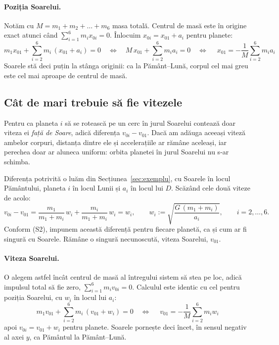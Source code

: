 \documentclass[11pt,a4paper]{article}
\begin{document}
\paragraph{Poziția Soarelui.} Notăm cu $M = m_1 + m_2 + \dots + m_6$ masa totală. Centrul de masă este în origine exact atunci când $\sum_{i=1}^{6} m_i x_{0i} = 0$. Înlocuim $x_{0i} = x_{01} + a_i$ pentru planete:
\[
  m_1 x_{01} + \sum_{i=2}^{6} m_i\,(x_{01} + a_i) = 0
  \quad\Longleftrightarrow\quad
  M\,x_{01} + \sum_{i=2}^{6} m_i a_i = 0
  \quad\Longleftrightarrow\quad
  \boxed{\;x_{01} = -\frac{1}{M}\sum_{i=2}^{6} m_i a_i\;}
\]
Soarele stă deci puțin la stânga originii: ca la Pământ--Lună, corpul cel mai greu este cel mai aproape de centrul de masă.

\subsection*{Cât de mari trebuie să fie vitezele}
Pentru ca planeta $i$ să se rotească pe un cerc în jurul Soarelui contează doar viteza ei \emph{față de Soare}, adică diferența $v_{0i} - v_{01}$. Dacă am adăuga aceeași viteză ambelor corpuri, distanța dintre ele și accelerațiile ar rămâne aceleași, iar perechea doar ar aluneca uniform: orbita planetei în jurul Soarelui nu s-ar schimba.

Diferența potrivită o luăm din Secțiunea~\ref{sec:exemplu}, cu Soarele în locul Pământului, planeta $i$ în locul Lunii și $a_i$ în locul lui $D$. Scăzând cele două viteze de acolo:
\[
  v_{0i} - v_{01} = \frac{m_1}{m_1 + m_i}\,w_i + \frac{m_i}{m_1 + m_i}\,w_i = w_i, \qquad w_i := \sqrt{\frac{G\,(m_1 + m_i)}{a_i}}, \qquad i = 2, \dots, 6 .
\]
Conform (S2), impunem această diferență pentru fiecare planetă, ca și cum ar fi singură cu Soarele. Rămâne o singură necunoscută, viteza Soarelui, $v_{01}$.

\paragraph{Viteza Soarelui.} O alegem astfel încât centrul de masă al întregului sistem să stea pe loc, adică impulsul total să fie zero, $\sum_{i=1}^{6} m_i v_{0i} = 0$. Calculul este identic cu cel pentru poziția Soarelui, cu $w_i$ în locul lui $a_i$:
\[
  m_1 v_{01} + \sum_{i=2}^{6} m_i\,(v_{01} + w_i) = 0
  \quad\Longleftrightarrow\quad
  \boxed{\;v_{01} = -\frac{1}{M}\sum_{i=2}^{6} m_i w_i\;}
\]
apoi $v_{0i} = v_{01} + w_i$ pentru planete. Soarele pornește deci încet, în sensul negativ al axei $y$, ca Pământul la Pământ--Lună.
\end{document}

